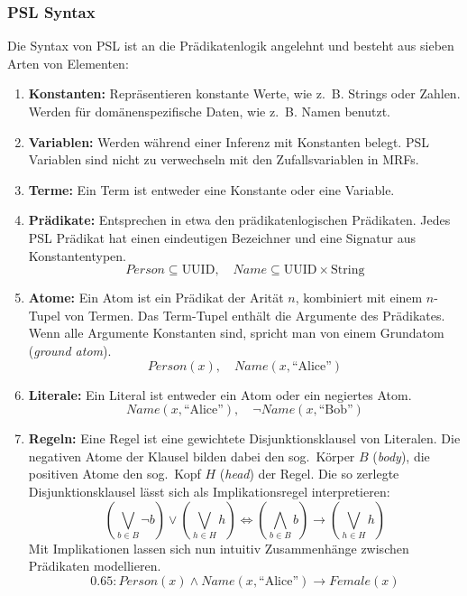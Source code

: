 \subsubsection{PSL Syntax}
Die Syntax von PSL ist an die Prädikatenlogik angelehnt und besteht aus sieben Arten von Elementen:
\begin{enumerate}
	\item \textbf{Konstanten:}
		Repräsentieren konstante Werte, wie z.~B. Strings oder Zahlen.
		Werden für domänenspezifische Daten, wie z.~B. Namen benutzt.
	\item \textbf{Variablen:}
		Werden während einer Inferenz mit Konstanten belegt.
		PSL Variablen sind nicht zu verwechseln mit den Zufallsvariablen in MRFs.
	\item \textbf{Terme:}
		Ein Term ist entweder eine Konstante oder eine Variable.
	\item \textbf{Prädikate:}
		Entsprechen in etwa den prädikatenlogischen Prädikaten.
		Jedes PSL Prädikat hat einen eindeutigen Bezeichner und eine Signatur aus Konstantentypen.
		\[Person \subseteq \text{UUID},\quad Name \subseteq \text{UUID} \times \text{String}\]
	\item \textbf{Atome:}
		Ein Atom ist ein Prädikat der Arität $n$, kombiniert mit einem $n$-Tupel von Termen.
		Das Term-Tupel enthält die Argumente des Prädikates.
		Wenn alle Argumente Konstanten sind, spricht man von einem Grundatom (\textit{ground atom}). \\
		\[Person(x),\quad Name(x, \text{``Alice''})\] %
	\item \textbf{Literale:}
		Ein Literal ist entweder ein Atom oder ein negiertes Atom. \\
		\[Name(x, \text{``Alice''}),\quad \lnot Name(x, \text{``Bob''})\] %
	\item \textbf{Regeln:}
		Eine Regel ist eine gewichtete Disjunktionsklausel von Literalen.
		Die negativen Atome der Klausel bilden dabei den sog.\ Körper $B$ (\textit{body}), die positiven Atome den sog.\ Kopf $H$ (\textit{head}) der Regel.
		Die so zerlegte Disjunktionsklausel lässt sich als Implikationsregel interpretieren:
		\[
			\left(\bigvee_{b \in B} \lnot b\right) \lor \left(\bigvee_{h \in H} h\right) \Leftrightarrow \left(\bigwedge_{b \in B}  b\right) \rightarrow \left(\bigvee_{h \in H} h\right)
		\]
		Mit Implikationen lassen sich nun intuitiv Zusammenhänge zwischen Prädikaten modellieren.\\
		\[0.65: Person(x) \land Name(x, \text{``Alice''}) \rightarrow Female(x)\] %
\end{enumerate}

